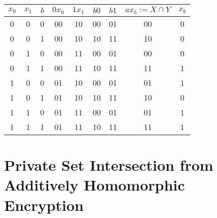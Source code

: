 \documentclass{report}
\begin{document}
		\begin{center}
			\begin{tabular}{|c|c|c||c|c|c|c||c|c|}
				\hline
				$x_0$ & $x_1$ & $b$ & $0x_0$ & $1x_1$ & $b0$ & $b1$ & $ax_b := X \cap Y$ & $x_b$ \\
				\hline
				\textcolor{MarzRed}{0} & 0 & 0 & 00 & 10 & 00 & 01 & 00 & \textcolor{MarzRed}{0} \\
				0 & \textcolor{MarzRed}{0} & 1 & 00 & 10 & 10 & 11 & 10 & \textcolor{MarzRed}{0} \\
				\textcolor{MarzRed}{0} & 1 & 0 & 00 & 11 & 00 & 01 & 00 & \textcolor{MarzRed}{0} \\
				0 & \textcolor{MarzRed}{1} & 1 & 00 & 11 & 10 & 11 & 11 & \textcolor{MarzRed}{1} \\
				\textcolor{MarzRed}{1} & 0 & 0 & 01 & 10 & 00 & 01 & 01 & \textcolor{MarzRed}{1} \\
				1 & \textcolor{MarzRed}{0} & 1 & 01 & 10 & 10 & 11 & 10 & \textcolor{MarzRed}{0} \\
				\textcolor{MarzRed}{1} & 1 & 0 & 01 & 11 & 00 & 01 & 01 & \textcolor{MarzRed}{1} \\
				1 & \textcolor{MarzRed}{1} & 1 & 01 & 11 & 10 & 11 & 11 & \textcolor{MarzRed}{1} \\
				\hline
			\end{tabular}
		\end{center}
	\closesection
	
	\section{Private Set Intersection from Additively Homomorphic Encryption}
	\startsection
\end{document}
